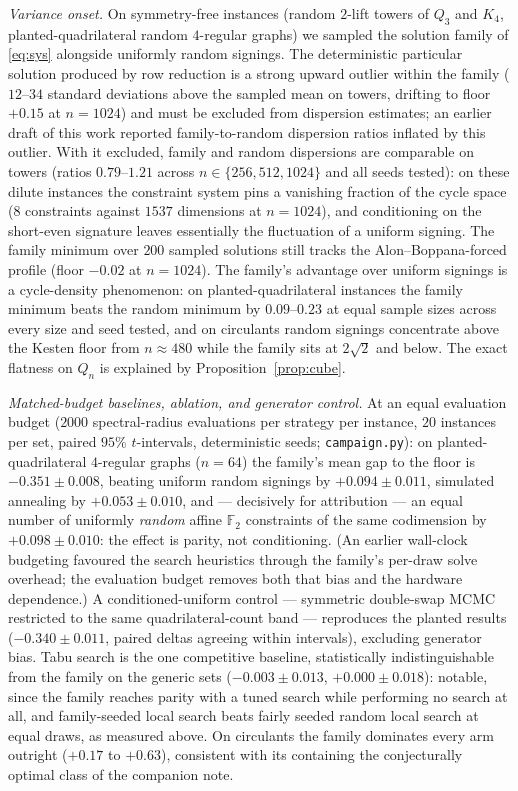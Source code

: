 \documentclass[11pt]{article}
\theoremstyle{remark}
\begin{document}
\emph{Variance onset.} On symmetry-free instances (random $2$-lift
towers of $Q_3$ and $K_4$, planted-quadrilateral random $4$-regular
graphs) we sampled the solution family of \eqref{eq:sys} alongside
uniformly random signings. The deterministic particular solution
produced by row reduction is a strong upward outlier within the family
($12$--$34$ standard deviations above the sampled mean on towers,
drifting to floor $+0.15$ at $n=1024$) and must be excluded from
dispersion estimates; an earlier draft of this work reported
family-to-random dispersion ratios inflated by this outlier. With it
excluded, family and random dispersions are comparable on towers
(ratios $0.79$--$1.21$ across $n\in\{256,512,1024\}$ and all seeds
tested): on these dilute instances the constraint system pins a
vanishing fraction of the cycle space ($8$ constraints against $1537$
dimensions at $n=1024$), and conditioning on the short-even signature
leaves essentially the fluctuation of a uniform signing. The family
minimum over $200$ sampled solutions still tracks the
Alon--Boppana-forced profile (floor $-0.02$ at $n=1024$). The family's
advantage over uniform signings is a cycle-density phenomenon: on
planted-quadrilateral instances the family minimum beats the random
minimum by $0.09$--$0.23$ at equal sample sizes across every size and
seed tested, and on circulants random signings concentrate above the
Kesten floor from $n\approx480$ while the family sits at $2\sqrt2$ and
below. The exact flatness on
$Q_n$ is explained by Proposition~\ref{prop:cube}.

\emph{Matched-budget baselines, ablation, and generator control.} At
an equal evaluation budget ($2000$ spectral-radius evaluations per
strategy per instance, $20$ instances per set, paired $95\%$
$t$-intervals, deterministic seeds; \texttt{campaign.py}): on
planted-quadrilateral $4$-regular graphs ($n=64$) the family's mean gap
to the floor is $-0.351\pm0.008$, beating uniform random signings by
$+0.094\pm0.011$, simulated annealing by $+0.053\pm0.010$, and ---
decisively for attribution --- an equal number of uniformly
\emph{random} affine $\mathbb F_2$ constraints of the same codimension
by $+0.098\pm0.010$: the effect is parity, not conditioning. (An
earlier wall-clock budgeting favoured the search heuristics through the
family's per-draw solve overhead; the evaluation budget removes both
that bias and the hardware dependence.) A conditioned-uniform control
--- symmetric double-swap MCMC restricted to the same
quadrilateral-count band --- reproduces the planted results
($-0.340\pm0.011$, paired deltas agreeing within intervals), excluding
generator bias. Tabu search is the one competitive baseline,
statistically indistinguishable from the family on the generic sets
($-0.003\pm0.013$, $+0.000\pm0.018$): notable, since the family reaches
parity with a tuned search while performing no search at all, and
family-seeded local search beats fairly seeded random local search at
equal draws, as measured above. On circulants the family dominates
every arm outright ($+0.17$ to $+0.63$), consistent with its containing
the conjecturally optimal class of the companion note.
\end{document}
